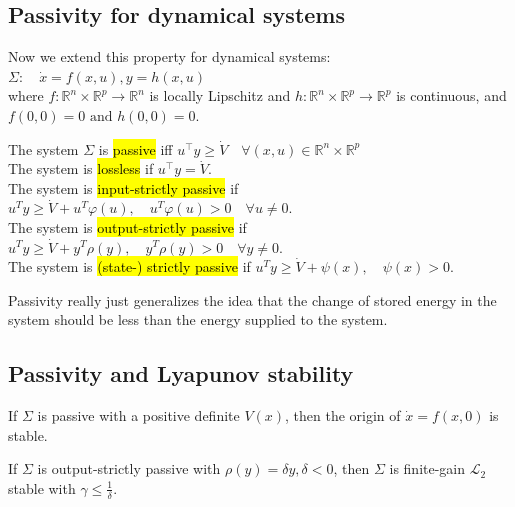 \subsection{Passivity for dynamical systems}
Now we extend this property for dynamical systems: $\Sigma: \quad \dot{x}=f(x, u), y=h(x, u)$\\
where $f: \mathbb{R}^{n} \times \mathbb{R}^{p} \rightarrow \mathbb{R}^{n}$ is locally Lipschitz and $h: \mathbb{R}^{n} \times \mathbb{R}^{p} \rightarrow \mathbb{R}^{p}$ is continuous, and $f(0,0)=0 \text { and } h(0,0)=0$.

\begin{tcolorbox}[colback=white, colframe=teal]
\begin{definition}
    The system $\Sigma$ is \hl{passive} iff
    $u^{\top} y \geq \dot{V} \quad \forall(x, u) \in \mathbb{R}^{n} \times \mathbb{R}^{p}$\\
    The system is \hl{lossless} if  $u^{\top}y = \dot{V}$.\\
    The system is \hl{input-strictly passive} if $u^{T} y \geq \dot{V}+u^{T} \varphi(u), \quad u^{T} \varphi(u)>0 \quad \forall u \neq 0$.\\
    The system is \hl{output-strictly passive} if $u^{T} y \geq \dot{V}+y^{T} \rho(y), \quad y^{T} \rho(y)>0 \quad \forall y \neq 0$.\\
    The system is \hl{(state-) strictly passive} if $u^{T} y \geq \dot{V}+\psi(x), \quad \psi(x)>0$.
\end{definition}
\end{tcolorbox}

\begin{remark}
    Passivity really just generalizes the idea that the change of stored energy in the system should be less than the energy supplied to the system.
\end{remark}

\subsection{Passivity and Lyapunov stability}
\begin{lemma}
    If $\Sigma$ is passive with a positive definite $V(x)$, then the origin of $\dot{x}=f(x, 0)$ is stable.
\end{lemma}
\begin{lemma}
    If $\Sigma$ is output-strictly passive with $\rho(y) = \delta y, \delta < 0$, then $\Sigma$ is finite-gain $\mathscr{L}_{2}$ stable with $\gamma \leq \frac{1}{\delta}$.
\end{lemma}

